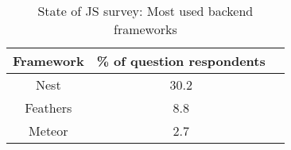 \begin{table}[ht]
\centering
\caption{State of JS survey: Most used backend frameworks \parencite{mostUsedBackendFrameworks22}}
\label{tab:backendFrameworksRanking}
\begin{tabular}[t]{|c|c|c|}
\toprule
Framework & \% of question respondents\\
\midrule
Nest & 30.2\\
Feathers & 8.8\\
Meteor & 2.7\\
\bottomrule
\end{tabular}
\end{table}
